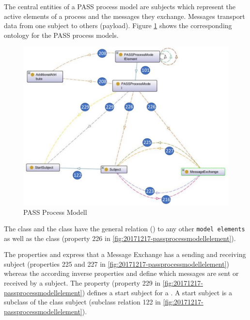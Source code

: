 The central entities of a PASS process model are subjects which represent the active elements of a process and the messages they exchange. Messages transport data from one subject to others (payload). Figure \ref{fig:20181217-passprocessmodel} shows the corresponding ontology for the PASS process models.

\begin{figure}[htbp]
	\centering
	\includegraphics[width=1.0\linewidth]{Figures/Ontology/SubjectInteraction/20181217-PASSProcessModel}
	\caption[PASS Process Modell]{PASS Process Modell}
	\label{fig:20181217-passprocessmodel}
\end{figure}


The class  and the class  have the general relation () to any other \texttt{model elements} as well as the class  (property 226 in \ref{fig:20171217-passprocessmodellelement}). 

The properties  and  express that a Message Exchange has a sending and receiving subject (properties 225 and 227 in \ref{fig:20171217-passprocessmodellelement}) whereas the according inverse properties  and  define which messages are sent or received by a subject. The property  (property 229 in \ref{fig:20171217-passprocessmodellelement}) defines a start subject for a . A start subject is a subclass of the class subject (subclass relation 122 in \ref{fig:20171217-passprocessmodellelement}).

